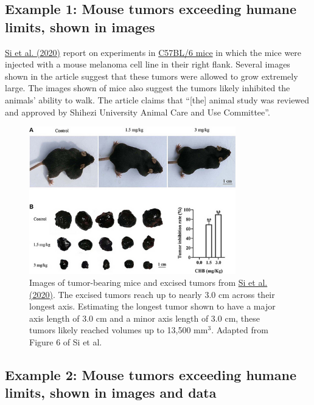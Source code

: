 \documentclass[letterpaper, 12pt]{article}
\begin{document}
\pagebreak

\subsection*{Example 1: Mouse tumors exceeding humane limits, shown in images}

\href{https://doi.org/10.3389/fonc.2020.00415}{Si et al. (2020)} report on experiments in \href{https://en.wikipedia.org/wiki/C57BL/6}{C57BL/6 mice} in which the mice were injected with a mouse melanoma cell line in their right flank. Several images shown in the article suggest that these tumors were allowed to grow extremely large. The images shown of mice also suggest the tumors likely inhibited the animals' ability to walk. The article claims that ``[the] animal study was reviewed and approved by Shihezi University Animal Care and Use Committee''.

\begin{figure}[h!tbp]
    \centering
    \includegraphics[width=0.8\textwidth]{img/tumor_burden/Screenshot 2025-04-04 at 15-23-31 fonc-10-00415-g006.png}
    \caption*{Images of tumor-bearing mice and excised tumors from \href{https://doi.org/10.3389/fonc.2020.00415}{Si et al. (2020)}. The excised tumors reach up to nearly 3.0 cm across their longest axis. Estimating the longest tumor shown to have a major axis length of 3.0 cm and a minor axis length of 3.0 cm, these tumors likely reached volumes up to 13,500 mm$^3$. Adapted from Figure 6 of Si et al.}
\end{figure}

\pagebreak

\subsection*{Example 2: Mouse tumors exceeding humane limits, shown in images and data}
\end{document}

